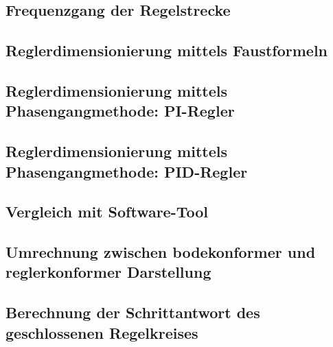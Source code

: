 \clearpage
\subsection{Frequenzgang der Regelstrecke}
\label{subs:frequenzgang}


\clearpage
\subsection{Reglerdimensionierung mittels Faustformeln}
\label{subs:faustformeln}


\clearpage
\subsection{Reglerdimensionierung mittels Phasengangmethode: PI-Regler}
\label{subs:phasengang:pi}


\clearpage
\subsection{Reglerdimensionierung mittels Phasengangmethode: PID-Regler}
\label{subs:phasengang:pid}


\clearpage
\subsection{Vergleich mit Software-Tool}
\label{subs:tool:results}


\clearpage
\subsection{Umrechnung zwischen bodekonformer und reglerkonformer Darstellung}
\label{subs:bode_regler}


\clearpage
\subsection{Berechnung der Schrittantwort des geschlossenen Regelkreises}
\label{subs:fft}

